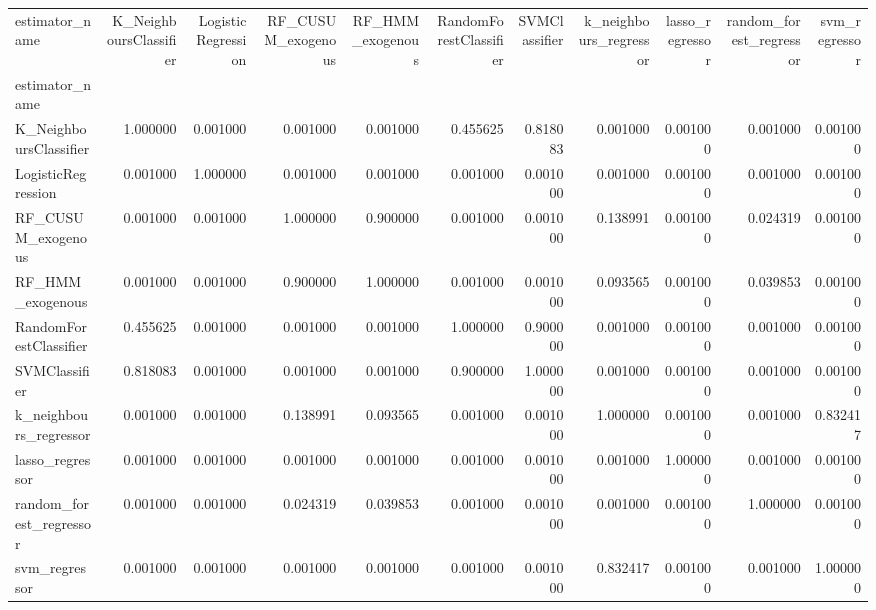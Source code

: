 \begin{tabular}{lrrrrrrrrrr}
\toprule
estimator_name & K_NeighboursClassifier & LogisticRegression & RF_CUSUM_exogenous & RF_HMM_exogenous & RandomForestClassifier & SVMClassifier & k_neighbours_regressor & lasso_regressor & random_forest_regressor & svm_regressor \\
estimator_name &  &  &  &  &  &  &  &  &  &  \\
\midrule
K_NeighboursClassifier & 1.000000 & 0.001000 & 0.001000 & 0.001000 & 0.455625 & 0.818083 & 0.001000 & 0.001000 & 0.001000 & 0.001000 \\
LogisticRegression & 0.001000 & 1.000000 & 0.001000 & 0.001000 & 0.001000 & 0.001000 & 0.001000 & 0.001000 & 0.001000 & 0.001000 \\
RF_CUSUM_exogenous & 0.001000 & 0.001000 & 1.000000 & 0.900000 & 0.001000 & 0.001000 & 0.138991 & 0.001000 & 0.024319 & 0.001000 \\
RF_HMM_exogenous & 0.001000 & 0.001000 & 0.900000 & 1.000000 & 0.001000 & 0.001000 & 0.093565 & 0.001000 & 0.039853 & 0.001000 \\
RandomForestClassifier & 0.455625 & 0.001000 & 0.001000 & 0.001000 & 1.000000 & 0.900000 & 0.001000 & 0.001000 & 0.001000 & 0.001000 \\
SVMClassifier & 0.818083 & 0.001000 & 0.001000 & 0.001000 & 0.900000 & 1.000000 & 0.001000 & 0.001000 & 0.001000 & 0.001000 \\
k_neighbours_regressor & 0.001000 & 0.001000 & 0.138991 & 0.093565 & 0.001000 & 0.001000 & 1.000000 & 0.001000 & 0.001000 & 0.832417 \\
lasso_regressor & 0.001000 & 0.001000 & 0.001000 & 0.001000 & 0.001000 & 0.001000 & 0.001000 & 1.000000 & 0.001000 & 0.001000 \\
random_forest_regressor & 0.001000 & 0.001000 & 0.024319 & 0.039853 & 0.001000 & 0.001000 & 0.001000 & 0.001000 & 1.000000 & 0.001000 \\
svm_regressor & 0.001000 & 0.001000 & 0.001000 & 0.001000 & 0.001000 & 0.001000 & 0.832417 & 0.001000 & 0.001000 & 1.000000 \\
\bottomrule
\end{tabular}
